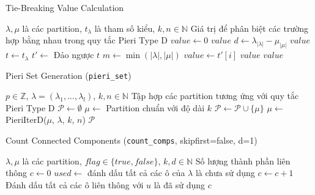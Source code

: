 \begin{algorithm}[H]
\caption{Tie-Breaking Value Calculation}
\begin{algorithmic}[1]
\REQUIRE $\lambda, \mu$ là các partition, $t_\lambda$ là tham số kiểu, $k, n \in \mathbb{N}$
\ENSURE Giá trị để phân biệt các trường hợp bằng nhau trong quy tắc Pieri Type D
\STATE $value \gets 0$
\IF{$\lambda = \mu$}
    \RETURN $value$
\ENDIF
\STATE $d \gets \lambda_{|\lambda|} - \mu_{|\mu|}$
    \RETURN $value$
\ENDIF
\STATE $t \gets t_\lambda$
\STATE $t' \gets$ Đảo ngược $t$
\STATE $m \gets \min(|\lambda|, |\mu|)$
    \IF{$\lambda[i] \neq \mu[i]$}
        \STATE $value \gets t'[i]$
        \RETURN $value$
    \ENDIF
\ENDFOR
\RETURN $value$
\end{algorithmic}
\end{algorithm}

\begin{algorithm}[H]
\caption{Pieri Set Generation (\texttt{pieri\_set})}
\begin{algorithmic}[1]
\REQUIRE $p \in \mathbb{Z}$, $\lambda = (\lambda_1, ..., \lambda_l)$, $k, n \in \mathbb{N}$
\ENSURE Tập hợp các partition tương ứng với quy tắc Pieri Type D
\STATE $\mathcal{P} \gets \emptyset$
\STATE $\mu \gets$ Partition chuẩn với độ dài $k$
\WHILE{$\mu \neq \emptyset$}
    \STATE $\mathcal{P} \gets \mathcal{P} \cup \{\mu\}$
    \STATE $\mu \gets$ PieriIterD($\mu$, $\lambda$, $k$, $n$)
\ENDWHILE
\RETURN $\mathcal{P}$
\end{algorithmic}
\end{algorithm}

\begin{algorithm}[H]
\caption{Count Connected Components (\texttt{count\_comps}, skipfirst=false, d=1)}
\begin{algorithmic}[1]
\REQUIRE $\lambda, \mu$ là các partition, $flag \in \{true, false\}$, $k, d \in \mathbb{N}$
\ENSURE Số lượng thành phần liên thông
\STATE $c \gets 0$
\STATE $used \gets$ đánh dấu tất cả các ô của $\lambda$ là chưa sử dụng
        \STATE $c \gets c + 1$
        \STATE Đánh dấu tất cả các ô liên thông với $u$ là đã sử dụng
    \ENDIF
\ENDFOR
\RETURN $c$
\end{algorithmic}
\end{algorithm}

